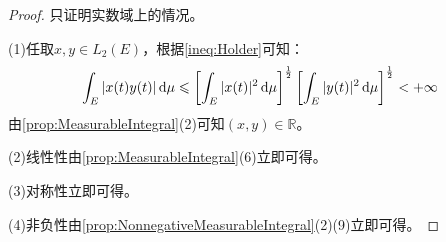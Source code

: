 \begin{proof}
	只证明实数域上的情况。\par
	(1)任取$x,y\in L_2(E)$，根据\cref{ineq:Holder}可知：
	\begin{equation*}
		\int_{E}|x(t)y(t)|\mathop{}\!\mathrm{d}\mu\leqslant\left[\int_{E}|x(t)|^2\mathop{}\!\mathrm{d}\mu\right]^{\frac{1}{2}}\left[\int_{E}|y(t)|^2\mathop{}\!\mathrm{d}\mu\right]^{\frac{1}{2}}<+\infty
	\end{equation*}
	由\cref{prop:MeasurableIntegral}(2)可知$(x,y)\in\mathbb{R}$。\par
	(2)线性性由\cref{prop:MeasurableIntegral}(6)立即可得。\par
	(3)对称性立即可得。\par
	(4)非负性由\cref{prop:NonnegativeMeasurableIntegral}(2)(9)立即可得。
\end{proof}


